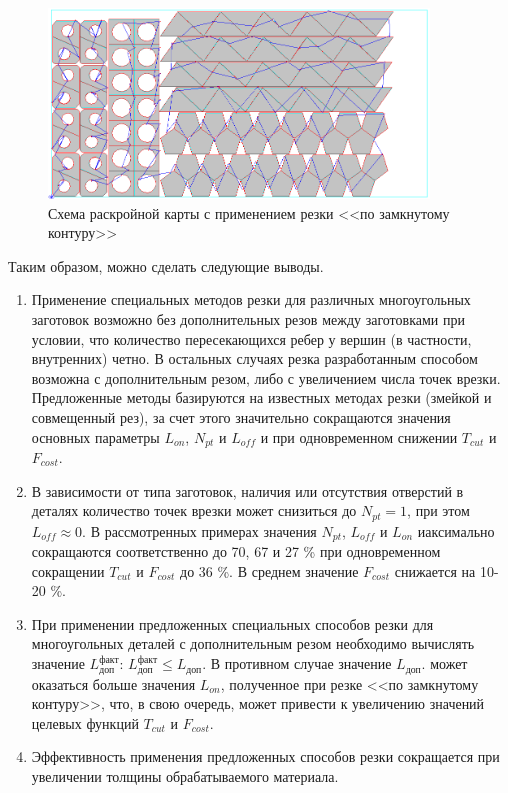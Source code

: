 \documentclass[11pt,twoside,openany]{report}
\begin{document}
\begin{figure}[h]
  \begin{center}
  \includegraphics[width=0.9\textwidth]{multi-b.png}
  \caption{Схема раскройной карты с применением резки <<по замкнутому контуру>>}
  \label{multi-b}
  \end{center}
\end{figure}

Таким образом, можно сделать следующие выводы.

\begin{enumerate}
\item
Применение специальных методов резки
для различных многоугольных заготовок возможно
без дополнительных резов между заготовками при условии,
что количество пересекающихся ребер у вершин
(в частности, внутренних) четно.
В остальных случаях резка разработанным
способом возможна с дополнительным резом,
либо с увеличением числа точек врезки.
Предложенные методы базируются на известных методах резки
(змейкой и совмещенный рез),
за счет этого значительно сокращаются
значения основных параметры
$L_{on}$, $N_{pt}$  и $L_{off}$
и   при одновременном снижении
$T_{cut}$
и
$F_{cost}$.

\item
В зависимости от типа заготовок,
наличия или отсутствия отверстий в деталях
количество точек врезки может снизиться до
$N_{pt}=1$,
при этом
$L_{off} \approx 0$.
В рассмотренных примерах значения
$N_{pt}$, $L_{off}$ и $L_{on}$
иаксимально сокращаются соответственно до 70, 67 и 27 \%
при одновременном сокращении
$T_{cut}$
и
$F_{cost}$
до 36 \%.
В среднем значение $F_{cost}$ снижается на 10-20 \%.

\item
При применении предложенных специальных способов резки
для многоугольных деталей с дополнительным резом
необходимо вычислять значение
$L_\text{доп}^\text{факт}$:
$L_\text{доп}^\text{факт} \leqslant L_\text{доп}$.
В противном случае значение
$L_\text{доп}$.
может оказаться больше значения
$L_{on}$,
полученное при резке <<по замкнутому контуру>>,
что,
в свою очередь,
может привести к увеличению значений целевых функций
$T_{cut}$
и
$F_{cost}$.

\item Эффективность применения предложенных способов резки
сокращается при увеличении толщины обрабатываемого материала.
\end{enumerate}
\end{document}
